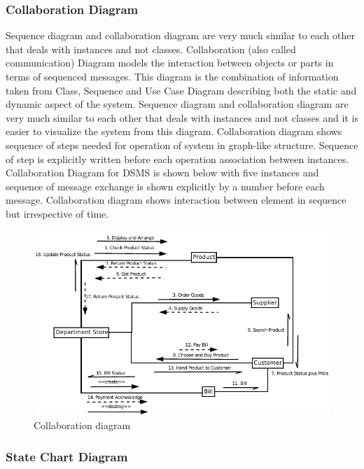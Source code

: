 \subsubsection{Collaboration Diagram}

Sequence diagram and collaboration diagram are very much similar to each other
that deals with instances and not classes. Collaboration (also called
communication) Diagram models the interaction between objects or parts in terms
of sequenced messages. This diagram is the combination of information taken
from Class, Sequence and Use Case Diagram describing both the static and
dynamic aspect of the system. Sequence diagram and collaboration diagram are
very much similar to each other that deals with instances and not classes and
it is easier to visualize the system from this diagram. Collaboration diagram
shows sequence of steps needed for operation of system in graph-like structure.
Sequence of step is explicitly written before each operation association
between instances. Collaboration Diagram for DSMS is shown below with five
instances and sequence of message exchange is shown explicitly by a number
before each message. Collaboration diagram shows interaction between element in
sequence but irrespective of time.

\begin{figure}[h]\centering
  \includegraphics[width=\textwidth]{fig/collaboration}
  \caption{Collaboration diagram}\label{fig:collaboration}
\end{figure}

\subsubsection{State Chart Diagram}

